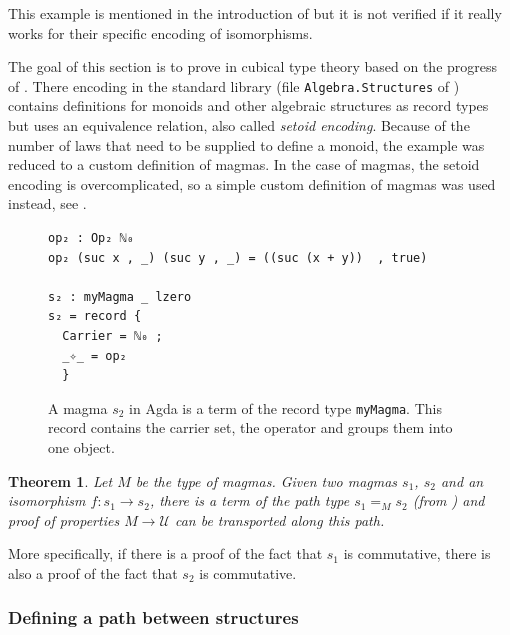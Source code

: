\documentclass[12pt,a4paper,twoside,xetex]{book} %
\newcommand{\keyword}[1]{\emph{#1}\index{#1}}
\newtheorem{theorem}{Theorem}[section]
\begin{document}
This example is mentioned in the introduction of \cite{Coquand2013} but it is not verified if it really works for their specific encoding of isomorphisms.


The goal of this section is to prove  in cubical type theory based on the progress of \cite{Danielsson2012}. There encoding in the standard library (file \texttt{Algebra.Structures} of \cite{Danielsson2019}) contains definitions for monoids and other algebraic 
structures as record types but uses an equivalence relation, also called \keyword{setoid encoding}. Because of the number of  laws that need to be 
supplied to define a monoid, the example was reduced to a custom definition of 
magmas. In the case of magmas, the setoid encoding is overcomplicated, so a simple custom definition of magmas was used instead, see . 

\begin{figure}\label{m2def}
\begin{center}
\begin{BVerbatim}
op₂ : Op₂ ℕ₀
op₂ (suc x , _) (suc y , _) = ((suc (x + y))  , true)

s₂ : myMagma _ lzero
s₂ = record {
  Carrier = ℕ₀ ;
  _✧_ = op₂
  }
\end{BVerbatim}
\end{center}

 \caption{A magma $s_2$ in Agda is a term of the record type \texttt{myMagma}. This record contains the carrier set, the operator and groups them into one object.}
\end{figure}

\begin{theorem}\label{magmatransp}
Let $M$ be the type of magmas. Given two magmas $s_1$, $s_2$ and an isomorphism $f : s_1 \rightarrow s_2$, there is a term of the path type $s_1 =_M s_2$ (from ) and proof of properties $M \rightarrow \mathcal{U}$ can be transported along this path. 
\end{theorem}

More specifically, if there is a proof of the fact that $s_1$ is commutative, there is also a proof of the fact that $s_2$ is commutative. 




\subsubsection{Defining a path between structures}
\end{document}
